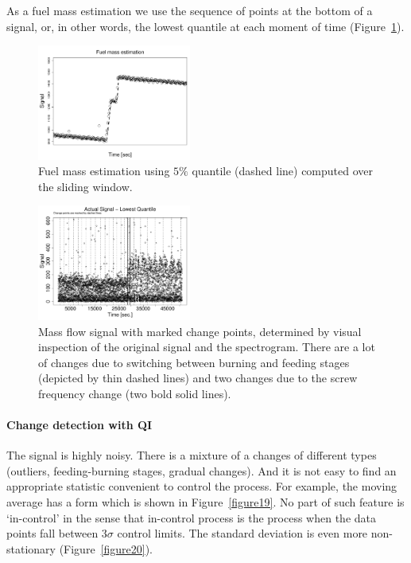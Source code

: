 As a fuel mass estimation we use the sequence of points at the bottom of a signal, or, in other words, the lowest quantile at each moment of time (Figure~\ref{figure16}).

\begin{figure}[htb!]
\includegraphics[width=0.45\textwidth]{articles/pics/cfb_paper/OMF/OMFestim2}
\caption{Fuel mass estimation using $5\%$ quantile (dashed line) computed over the sliding window.}\label{figure16}
\end{figure}

\begin{figure}[htb!]
\includegraphics[width=0.45\textwidth]{articles/pics/cfb_paper/OMF/OMFscalednoise}
\caption{Mass flow signal with marked change points, determined by visual inspection of the original signal and the spectrogram.
There are a lot of changes due to switching between burning and feeding stages (depicted by thin dashed lines) and
two changes due to the screw frequency change (two bold solid lines).}
\label{figure18}
\end{figure}

\paragraph{Change detection with QI}
The signal is highly noisy.
There is a mixture of a changes of different types (outliers, feeding-burning stages, gradual changes).
And it is not easy to find an appropriate statistic convenient to control the process.
For example, the moving average has a form which is shown in Figure~\ref{figure19}.
No part of such feature is `in-control' in the sense that in-control process is the process
when the data points fall between $3\sigma$ control limits.
The standard deviation is even more non-stationary (Figure~\ref{figure20}).

